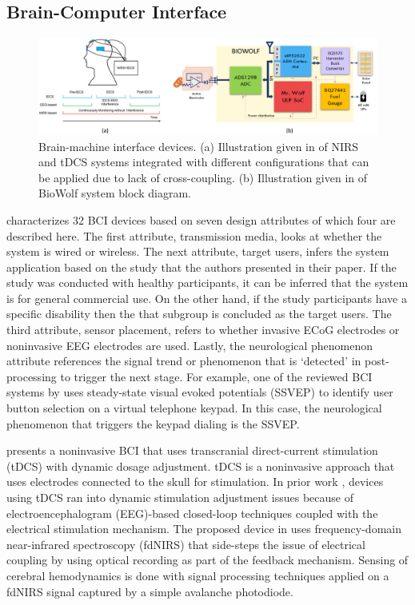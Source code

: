 \subsection{Brain-Computer Interface}
\begin{figure}[t]
    \centering
    \includegraphics[width=\textwidth]{Figure/CognitiveAid/BCIcollage3}
    \caption{Brain-machine interface devices. (a) Illustration given in \textcite{miao_cmos-based_2018} of NIRS and tDCS systems integrated with different configurations that can be applied due to lack of cross-coupling. (b) Illustration given in \textcite{kartsch_biowolf_2019} of BioWolf system block diagram.}
    \label{fig:BCICollage}
\end{figure}
\textcite{lin_review_2010} characterizes 32 BCI devices based on seven design attributes of which four are described here. The first attribute, transmission media, looks at whether the system is wired or wireless. The next attribute, target users, infers the system application based on the study that the authors presented in their paper. If the study was conducted with healthy participants, it can be inferred that the system is for general commercial use. On the other hand, if the study participants have a specific disability then the that subgroup is concluded as the target users. The third attribute, sensor placement, refers to whether invasive ECoG electrodes or noninvasive EEG electrodes are used. Lastly, the neurological phenomenon attribute references the signal trend or phenomenon that is `detected' in post-processing to trigger the next stage. For example, one of the reviewed BCI systems by \textcite{ming_cheng_design_2002} uses steady-state visual evoked potentials (SSVEP) to identify user button selection on a virtual telephone keypad. In this case, the neurological phenomenon that triggers the keypad dialing is the SSVEP.

\textcite{miao_cmos-based_2018} presents a noninvasive BCI that uses transcranial direct-current stimulation (tDCS) with dynamic dosage adjustment. tDCS is a noninvasive approach that uses electrodes connected to the skull for stimulation. In prior work \parencite{roh_wearable_2014}, devices using tDCS ran into dynamic stimulation adjustment issues because of electroencephalogram (EEG)-based closed-loop techniques coupled with the electrical stimulation mechanism. The proposed device in \textcite{miao_cmos-based_2018} uses frequency-domain near-infrared spectroscopy (fdNIRS) that side-steps the issue of electrical coupling by using optical recording as part of the feedback mechanism. Sensing of cerebral hemodynamics is done with signal processing techniques applied on a fdNIRS signal captured by a simple avalanche photodiode. 

